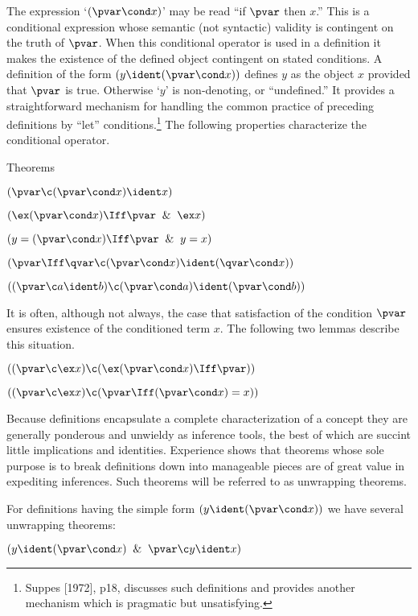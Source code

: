  The expression `$(\pvar \cond x)$' may be read ``if $\pvar$ then $x$.''
This is a conditional expression whose semantic
(not syntactic) validity is contingent on
the truth of $\pvar$.
When this conditional operator is used in a definition
it makes the existence of the defined object 
contingent on stated conditions.   A definition of the form
$(y \ident (\pvar \cond x))$ defines $y$ as the object $x$ provided
that $\pvar$ is true.  Otherwise `$y$' is non-denoting, or ``undefined.''
It provides
a straightforward mechanism for handling the common practice of preceding
definitions by ``let'' conditions.\footnote*{Suppes [1972], p18, discusses
such definitions and provides another mechanism which is pragmatic
but unsatisfying.}  
The following properties characterize the
conditional operator.
\lineb

\noindent{}Theorems

 $(\pvar \c (\pvar \cond x) \ident x)$

 $(\ex (\pvar \cond x) \Iff \pvar \And \ex x)$

 $(y = (\pvar \cond x) \Iff \pvar \And y = x)$

 $(\pvar \Iff \qvar \c (\pvar \cond x) \ident (\qvar \cond x))$

 $((\pvar \c a \ident b)\c (\pvar \cond a) \ident (\pvar \cond b))$
\lineb


It is often, although not always,
the case that satisfaction of the condition $\pvar$ ensures existence
of the conditioned term $x$. The following two lemmas describe this 
situation. 
\lineb

 $((\pvar \c \ex x) \c (\ex (\pvar \cond x) \Iff \pvar))$

 $((\pvar \c \ex x) \c 
	(\pvar \Iff (\pvar \cond x) = x))$
	\lineb

Because definitions encapsulate a complete characterization of
a concept they are generally ponderous and unwieldy as 
inference tools, the best of which are succint little implications
and identities.
Experience shows that theorems whose sole
purpose is to break definitions down into manageable pieces
are of great value in expediting inferences.
Such theorems will be referred to as unwrapping theorems.


For definitions having the simple form $(y \ident (\pvar \cond x))$ 
we have several unwrapping theorems:
\lineb

 $(y \ident (\pvar \cond x) \And \pvar \c y \ident x)$

